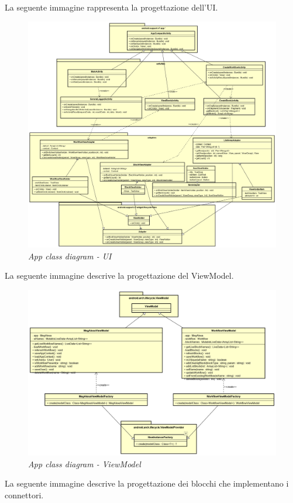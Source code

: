 La seguente immagine rappresenta la progettazione dell'UI.
\begin{figure} [H]
	\centering
	\includegraphics[scale=0.3]{./images/UI.png}
	\caption{\textit{App class diagram - UI}}\label{UI}
\end{figure}
\newpage
La seguente immagine descrive la progettazione del ViewModel.
\begin{figure} [H]
	\centering
	\includegraphics[scale=0.3]{./images/ViewModel.png}
	\caption{\textit{App class diagram - ViewModel}}\label{ViewModel}
\end{figure}
\newpage
La seguente immagine descrive la progettazione dei blocchi che implementano i connettori.
